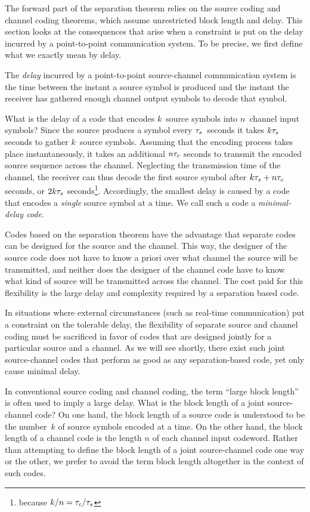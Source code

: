 The forward part of the separation theorem relies on the source coding and
channel coding theorems, which assume unrestricted block length and
delay. This section looks at the consequences that arise when a
constraint is put on the delay incurred by a point-to-point communication
system. To be precise, we first define what we exactly mean by delay.

\begin{definition}
  \label{def:delay}
  The \emph{delay} incurred by a point-to-point source-channel communication
  system is the time between the instant a source symbol is produced and the
  instant the receiver has gathered enough channel output symbols to decode that
  symbol. 
\end{definition}

What is the delay of a code that encodes $k$~source symbols into $n$~channel
input symbols? Since the source produces a symbol every ${\tau_s}$~seconds it takes
$k{\tau_s}$ seconds to gather $k$~source symbols. Assuming that the encoding process
takes place instantaneously, it takes an additional $n{\tau_c}$ seconds to transmit
the encoded source sequence across the channel. Neglecting the transmission time
of the channel, the receiver can thus decode the first source symbol after $k{\tau_s}
+ n {\tau_c}$ seconds, or $2k{\tau_s}$ seconds\footnote{because $k/n = {\tau_c}/{\tau_s}$}.
Accordingly, the smallest delay is caused by a code that encodes a \emph{single}
source symbol at a time. We call such a code a \emph{minimal-delay code}.

Codes based on the separation theorem have the advantage that separate codes can
be designed for the source and the channel. This way, the designer of the source
code does not have to know a priori over what channel the source will be
transmitted, and neither does the designer of the channel code have to know what
kind of source will be transmitted across the channel. The cost paid for this
flexibility is the large delay and complexity required by a separation based
code. 

In situations where external circumstances (such as real-time communication) put
a constraint on the tolerable delay, the flexibility of separate source and
channel coding must be sacrificed in favor of codes that are designed jointly
for a particular source and a channel. As we will see shortly, there exist such
joint source-channel codes that perform as good as any separation-based code,
yet only cause minimal delay.

\begin{remark}
  \label{rem:blocklength}
  In conventional source coding and channel coding, the term ``large block
  length'' is often used to imply a large delay. What is the block length of a
  joint source-channel code? On one hand, the block length of a source code is
  understood to be the number~$k$ of source symbols encoded at a time. On the
  other hand, the block length of a channel code is the length $n$ of each
  channel input codeword. Rather than attempting to define the block length of a
  joint source-channel code one way or the other, we prefer to avoid the term
  block length altogether in the context of such codes. 
\end{remark}

